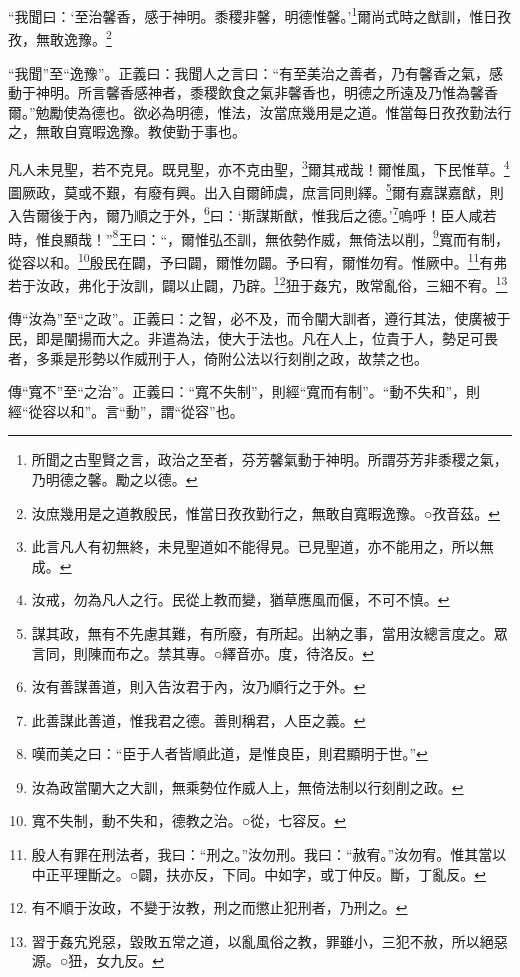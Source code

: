 “我聞曰：‘至治馨香，感于神明。黍稷非馨，明德惟馨。’\footnote{所聞之古聖賢之言，政治之至者，芬芳馨氣動于神明。所謂芬芳非黍稷之氣，乃明德之馨。勵之以德。}爾尚式時之猷訓，惟日孜孜，無敢逸豫。\footnote{汝庶幾用是之道教殷民，惟當日孜孜勤行之，無敢自寬暇逸豫。○孜音茲。}

{\noindent\shu{}\fzkt “我聞”至“逸豫”。正義曰：我聞人之言曰：“有至美治之善者，乃有馨香之氣，感動于神明。所言馨香感神者，黍稷飲食之氣非馨香也，明德之所遠及乃惟為馨香爾。”勉勵使為德也。欲必為明德，惟法，汝當庶幾用是之道。惟當每日孜孜勤法行之，無敢自寬暇逸豫。教使勤于事也。 \par}

凡人未見聖，若不克見。既見聖，亦不克由聖，\footnote{此言凡人有初無終，未見聖道如不能得見。已見聖道，亦不能用之，所以無成。}爾其戒哉！爾惟風，下民惟草。\footnote{汝戒，勿為凡人之行。民從上教而變，猶草應風而偃，不可不慎。}圖厥政，莫或不艱，有廢有興。出入自爾師虞，庶言同則繹。\footnote{謀其政，無有不先慮其難，有所廢，有所起。出納之事，當用汝總言度之。眾言同，則陳而布之。禁其專。○繹音亦。度，待洛反。}爾有嘉謀嘉猷，則入告爾後于內，爾乃順之于外，\footnote{汝有善謀善道，則入告汝君于內，汝乃順行之于外。}曰：‘斯謀斯猷，惟我后之德。’\footnote{此善謀此善道，惟我君之德。善則稱君，人臣之義。}嗚呼！臣人咸若時，惟良顯哉！”\footnote{嘆而美之曰：“臣于人者皆順此道，是惟良臣，則君顯明于世。”}王曰：“，爾惟弘丕訓，無依勢作威，無倚法以削，\footnote{汝為政當闡大之大訓，無乘勢位作威人上，無倚法制以行刻削之政。}寬而有制，從容以和。\footnote{寬不失制，動不失和，德教之治。○從，七容反。}殷民在闢，予曰闢，爾惟勿闢。予曰宥，爾惟勿宥。惟厥中。\footnote{殷人有罪在刑法者，我曰：“刑之。”汝勿刑。我曰：“赦宥。”汝勿宥。惟其當以中正平理斷之。○闢，扶亦反，下同。中如字，或丁仲反。斷，丁亂反。}有弗若于汝政，弗化于汝訓，闢以止闢，乃辟。\footnote{有不順于汝政，不變于汝教，刑之而懲止犯刑者，乃刑之。}狃于姦宄，敗常亂俗，三細不宥。\footnote{習于姦宄兇惡，毀敗五常之道，以亂風俗之教，罪雖小，三犯不赦，所以絕惡源。○狃，女九反。}


{\noindent\zhuan{}\fzbyks 傳“汝為”至“之政”。正義曰：之智，必不及，而令闡大訓者，遵行其法，使廣被于民，即是闡揚而大之。非遣為法，使大于法也。凡在人上，位貴于人，勢足可畏者，多乘是形勢以作威刑于人，倚附公法以行刻削之政，故禁之也。 \par}

{\noindent\zhuan{}\fzbyks 傳“寬不”至“之治”。正義曰：“寬不失制”，則經“寬而有制”。“動不失和”，則經“從容以和”。言“動”，謂“從容”也。 \par}

